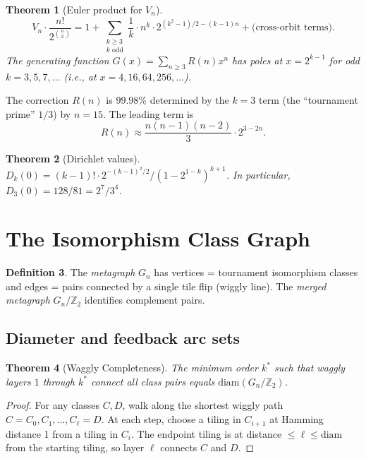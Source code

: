 \documentclass[11pt,a4paper]{article}
\newtheorem{theorem}{Theorem}[section]
\theoremstyle{definition}
\newtheorem{definition}[theorem]{Definition}
\theoremstyle{remark}
\begin{document}
\begin{theorem}[Euler product for $V_n$]
\label{thm:euler}
\[
V_n \cdot \frac{n!}{2^{\binom{n}{2}}} = 1 + \sum_{\substack{k \geq 3 \\ k \text{ odd}}} \frac{1}{k} \cdot n^{\underline{k}} \cdot 2^{(k^2-1)/2 - (k-1)n} + \text{(cross-orbit terms)}.
\]
The generating function $G(x) = \sum_{n \geq 3} R(n) x^n$ has poles at $x = 2^{k-1}$ for odd $k = 3, 5, 7, \ldots$ (i.e., at $x = 4, 16, 64, 256, \ldots$).
\end{theorem}

The correction $R(n)$ is $99.98\%$ determined by the $k = 3$ term (the ``tournament prime'' $1/3$) by $n = 15$. The leading term is
\[
R(n) \approx \frac{n(n-1)(n-2)}{3} \cdot 2^{3-2n}.
\]

\begin{theorem}[Dirichlet values]
\label{thm:dirichlet}
$D_k(0) = (k{-}1)! \cdot 2^{-(k-1)^2/2} / (1 - 2^{1-k})^{k+1}$. In particular, $D_3(0) = 128/81 = 2^7 / 3^4$.
\end{theorem}

\section{The Isomorphism Class Graph}
\label{sec:metagraph}

\begin{definition}
The \emph{metagraph} $G_n$ has vertices = tournament isomorphism classes and edges = pairs connected by a single tile flip (wiggly line). The \emph{merged metagraph} $G_n / \mathbb{Z}_2$ identifies complement pairs.
\end{definition}

\subsection{Diameter and feedback arc sets}

\begin{theorem}[Waggly Completeness]
\label{thm:completeness}
The minimum order $k^*$ such that waggly layers $1$ through $k^*$ connect all class pairs equals $\mathrm{diam}(G_n / \mathbb{Z}_2)$.
\end{theorem}

\begin{proof}
For any classes $C, D$, walk along the shortest wiggly path $C = C_0, C_1, \ldots, C_\ell = D$. At each step, choose a tiling in $C_{i+1}$ at Hamming distance 1 from a tiling in $C_i$. The endpoint tiling is at distance $\leq \ell \leq \mathrm{diam}$ from the starting tiling, so layer $\ell$ connects $C$ and $D$.
\end{proof}
\end{document}
